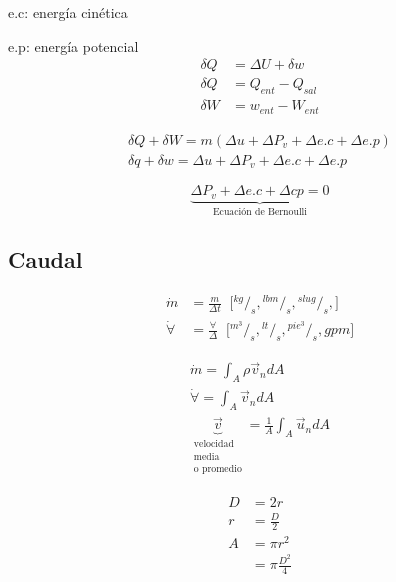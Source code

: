 e.c: energía cinética 

e.p: energía potencial
\[
    \begin{split}
        \delta Q & = \Delta U + \delta w \\
        \delta Q & = Q_{ent} - Q_{sal} \\
        \delta W & = w_{ent} - W_{ent}
    \end{split}
\]

\[
    \begin{split}
        \delta Q + \delta W = m (\Delta u + \Delta P_{v} + \Delta e.c + \Delta e.p) \\
        \delta q + \delta w = \Delta u + \Delta P_{v} + \Delta e.c + \Delta e.p
    \end{split}
\]

\[
    \underbrace{ \Delta P_{v} + \Delta e.c + \Delta cp = 0 }_{ \text{Ecuación de Bernoulli} }
\]

\subsection{Caudal}

\[
    \begin{split}
        \dot{ m } & = \frac{ m }{ \Delta t } \;\; \Big[ {}^{kg}/_{s}, {}^{lbm}/_{s}, {}^{slug}/_{s}, \Big] \\
        \dot{ \forall } & = \frac{ \forall }{ \Delta } \;\; \Big[ {}^{ m^{3} }/_{s}, {}^{ lt }/_{s}, {}^{ pie^{3} }/_{s}, gpm \Big]
    \end{split}
\]

\[
    \begin{split}
        \dot{ m } = \int_{A} \rho \vec{v}_{n} dA \\
        \dot{ \forall } = \int_{A} \vec{v}_{n} dA \\
        \underbrace{ \vec{ v } }_{
            \begin{array}{cc}
                \text{velocidad} \\
                \text{media} \\
                \text{o promedio}
            \end{array}
        } = \frac{ 1 }{ A } \int_{A} \vec{u}_{n} dA
    \end{split}
\]

\[
    \begin{split}
        D & = 2r \\
        r & = \frac{ D }{ 2 } \\
        A & = \pi r^{2} \\
        & = \pi \frac{ D^{2} }{ 4 }
    \end{split}
\]

